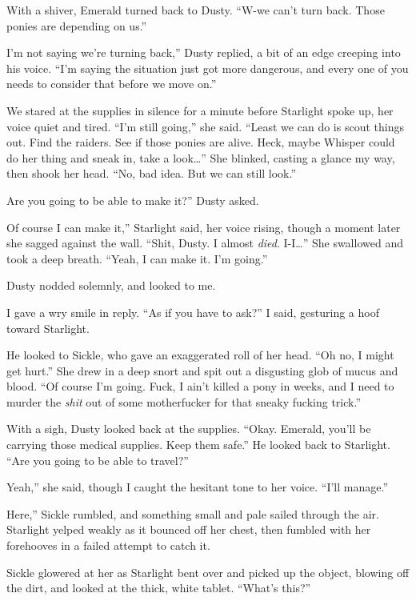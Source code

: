 With a shiver, Emerald turned back to Dusty. “W-we can’t turn back. Those ponies are depending on us.”

\leavevmode{}I’m not saying we’re turning back,” Dusty replied, a bit of an edge creeping into his voice. “I’m saying the situation just got more dangerous, and every one of you needs to consider that before we move on.”

We stared at the supplies in silence for a minute before Starlight spoke up, her voice quiet and tired. “I’m still going,” she said. “Least we can do is scout things out. Find the raiders. See if those ponies are alive. Heck, maybe Whisper could do her thing and sneak in, take a look…” She blinked, casting a glance my way, then shook her head. “No, bad idea. But we can still look.”

\leavevmode{}Are you going to be able to make it?” Dusty asked.

\leavevmode{}Of course I can make it,” Starlight said, her voice rising, though a moment later she sagged against the wall. “Shit, Dusty. I almost \textit{died}. I-I…” She swallowed and took a deep breath. “Yeah, I can make it. I’m going.”

Dusty nodded solemnly, and looked to me.

I gave a wry smile in reply. “As if you have to ask?” I said, gesturing a hoof toward Starlight.

He looked to Sickle, who gave an exaggerated roll of her head. “Oh no, I might get hurt.” She drew in a deep snort and spit out a disgusting glob of mucus and blood. “Of course I’m going. Fuck, I ain’t killed a pony in weeks, and I need to murder the \textit{shit} out of some motherfucker for that sneaky fucking trick.”

With a sigh, Dusty looked back at the supplies. “Okay. Emerald, you’ll be carrying those medical supplies. Keep them safe.” He looked back to Starlight. “Are you going to be able to travel?”

\leavevmode{}Yeah,” she said, though I caught the hesitant tone to her voice. “I’ll manage.”

\leavevmode{}Here,” Sickle rumbled, and something small and pale sailed through the air. Starlight yelped weakly as it bounced off her chest, then fumbled with her forehooves in a failed attempt to catch it.

Sickle glowered at her as Starlight bent over and picked up the object, blowing off the dirt, and looked at the thick, white tablet. “What’s this?”

